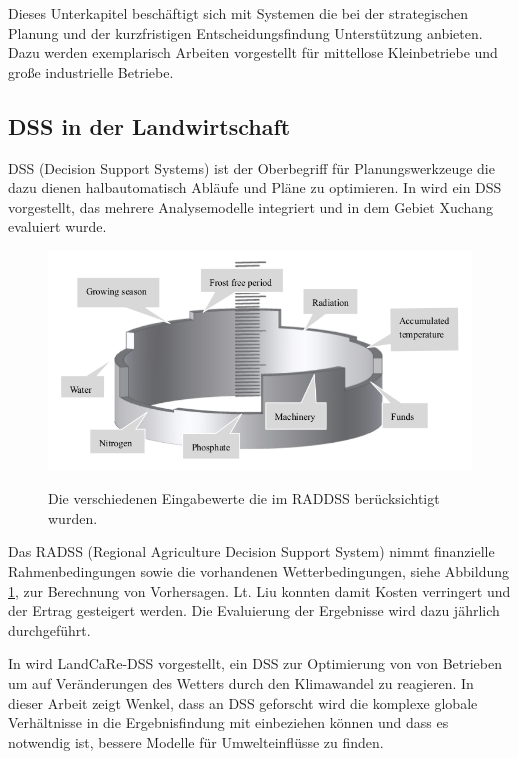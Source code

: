 Dieses Unterkapitel beschäftigt sich mit Systemen die bei der strategischen Planung und der kurzfristigen Entscheidungsfindung Unterstützung anbieten. Dazu werden exemplarisch Arbeiten vorgestellt für mittellose Kleinbetriebe und große industrielle Betriebe.

\subsection{DSS in der Landwirtschaft}
DSS (Decision Support Systems) ist der Oberbegriff für Planungswerkzeuge die dazu dienen halbautomatisch Abläufe und Pläne zu optimieren. In \cite{jour:Liu2013} wird ein DSS vorgestellt, das mehrere Analysemodelle integriert und in dem Gebiet Xuchang evaluiert wurde.

\begin{figure}[h]
 \includegraphics[scale=0.5,natwidth=\textwidth]{figures/designtools/dss_research.png}
 \centering
 \label{fig:dss_datasource}
 \caption{Die verschiedenen Eingabewerte die im RADDSS berücksichtigt wurden.}
\end{figure}

Das RADSS (Regional Agriculture Decision Support System) nimmt finanzielle Rahmenbedingungen sowie die vorhandenen Wetterbedingungen, siehe Abbildung \ref{fig:dss_datasource}, zur Berechnung von Vorhersagen. Lt. Liu konnten damit Kosten verringert und der Ertrag gesteigert werden. Die Evaluierung der Ergebnisse wird dazu jährlich durchgeführt.

In \cite{jour:Wenkel2011} wird LandCaRe-DSS vorgestellt, ein DSS zur Optimierung von von Betrieben um auf Veränderungen des Wetters durch den Klimawandel zu reagieren. In dieser Arbeit zeigt Wenkel, dass an DSS geforscht wird die komplexe globale Verhältnisse in die Ergebnisfindung mit einbeziehen können und dass es notwendig ist, bessere Modelle für Umwelteinflüsse zu finden.

